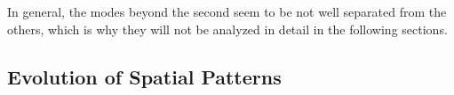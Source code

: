 In general, the modes beyond the second seem to be not well separated from the others, which is why they will not be analyzed in detail in the following sections. 

\subsection{Evolution of Spatial Patterns}
\label{sec:spatial pattern evolution}


%

